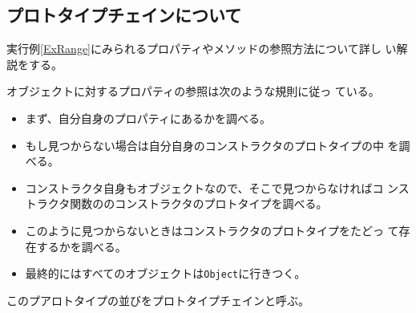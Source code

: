 \subsection{プロトタイプチェインについて}
実行例\ref{ExRange}にみられるプロパティやメソッドの参照方法について詳し
い解説をする。

オブジェクトに対するプロパティの参照は次のような規則に従っ
ている。
\begin{itemize}
 \item まず、自分自身のプロパティにあるかを調べる。
 \item もし見つからない場合は自分自身のコンストラクタのプロトタイプの中
       を調べる。
 \item コンストラクタ自身もオブジェクトなので、そこで見つからなければコ
       ンストラクタ関数ののコンストラクタのプロトタイプを調べる。
 \item このように見つからないときはコンストラクタのプロトタイプをたどっ
       て存在するかを調べる。
 \item 最終的にはすべてのオブジェクトは\texttt{Object}に行きつく。
\end{itemize}
このプアロトタイプの並びをプロトタイプチェインと呼ぶ。

